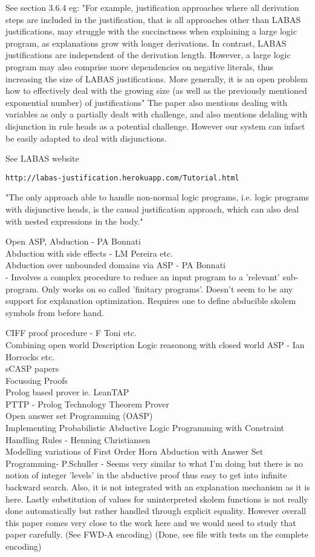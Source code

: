 See section 3.6.4 eg: "For example, justification approaches where all derivation steps are included in the
justification, that is all approaches other than LABAS justifications, may struggle
with the succinctness when explaining a large logic program, as explanations grow
with longer derivations. In contrast, LABAS justifications are independent of the
derivation length. However, a large logic program may also comprise more dependencies on negative literals, thus increasing the size of LABAS justifications. More
generally, it is an open problem how to effectively deal with the growing size (as
well as the previously mentioned exponential number) of justifications" The paper also mentions dealing with variables as only a partially dealt with challenge, and also mentions delaling with disjunction in rule heads as a potential challenge. However our system can infact be easily adapted to deal with disjunctions. 

See LABAS website
\begin{verbatim}
http://labas-justification.herokuapp.com/Tutorial.html    
\end{verbatim}
"The only approach able to handle non-normal
logic programs, i.e. logic programs with disjunctive heads, is the causal justification
approach, which can also deal with nested expressions in the body."

Open ASP, Abduction - PA Bonnati\\
Abduction with side effects - LM Pereira etc.\\
Abduction over unbounded domains via ASP - PA Bonnati\\ - Involves a complex procedure to reduce an input program to a 'relevant' sub-program. Only works on so called 'finitary programs'. Doesn't seem to be any support for explanation optimization. Requires one to define abducible skolem symbols from before hand.

CIFF proof procedure - F Toni etc.\\
Combining open world Description Logic reasonong with closed world ASP - Ian Horrocks etc.\\
sCASP papers\\
Focussing Proofs\\
Prolog based prover ie. LeanTAP\\
PTTP - Prolog Technology Theorem Prover\\
Open answer set Programming (OASP)\\
Implementing
Probabilistic Abductive Logic Programming
with Constraint Handling Rules - Henning Christiansen\\
Modelling variations of First Order Horn Abduction with Answer Set Programming- P.Schuller - Seems very similar to what I'm doing but there is no notion of integer 'levels' in the abductive proof thus easy to get into infinite backward search. Also, it is not integrated with an explanation mechanism as it is here. Lastly substitution of values for uninterpreted skolem functions is not really done automatically but rather handled through explicit equality. However overall this paper comes very close to the work here and we would need to study that paper carefully. (See FWD-A encoding) (Done, see file with tests on the complete encoding)

